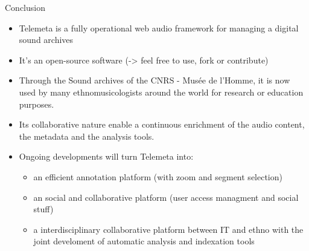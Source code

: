 \documentclass[final, hyperref, table]{beamer}
\begin{document}


\begin{frame}{Conclusion}
  \begin{itemize}[<+->]
  \item Telemeta is a \alert{fully operational} web audio framework for managing a digital sound archives
  \item It's an \alert{open-source} software (-> feel free to use, fork or contribute)
  \item Through the Sound archives of the CNRS - Musée de
l’Homme, it is now used by many ethnomusicologists around the world for research or education purposes.
\item Its collaborative nature enable a continuous enrichment of the audio content, the metadata and the analysis tools.
  \item Ongoing developments will turn Telemeta into:
    \begin{itemize}\footnotesize
    \item an efficient annotation platform (with zoom and segment selection)
    \item an social and collaborative platform (user access managment and social stuff)
    \item a interdisciplinary collaborative platform between IT and ethno with the joint develoment of automatic analysis and indexation tools
    \end{itemize}
  \end{itemize}

\end{frame}
\end{document}

